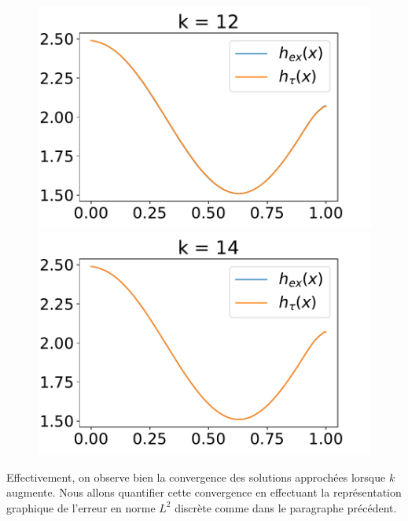 \documentclass[
11pt, %
francais, %
singlespacing, %
headsepline, %
f%
]{MastersDoctoralThesis} %
\theoremstyle{definition}
\begin{document}
\begin{figure}
\includegraphics[scale = .6]{testconvtau12}
\includegraphics[scale = .6]{testconvtau14} 
\end{figure}

Effectivement, on observe bien la convergence des solutions approchées lorsque $k$ augmente. Nous allons quantifier cette convergence en effectuant la représentation graphique de l'erreur en norme $L^{2}$ discrète comme dans le paragraphe précédent.
\end{document}
